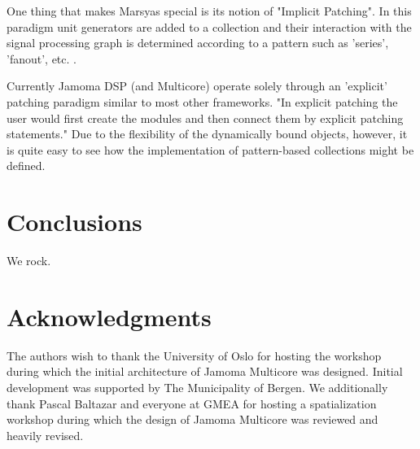\documentclass[twoside,a4paper]{article}
\begin{document}
One thing that makes Marsyas special is its notion of "Implicit Patching".  In this paradigm unit generators are added to a collection and their interaction with the signal processing graph is determined according to a pattern such as 'series', 'fanout', etc. \cite{Bray:2005}.

Currently Jamoma DSP (and Multicore) operate solely through an 'explicit' patching paradigm similar to most other frameworks.  "In explicit patching the user would first create the modules and then connect them by explicit patching statements."  Due to the flexibility of the dynamically bound objects, however, it is quite easy to see how the implementation of pattern-based collections might be defined.



\section{Conclusions}
We rock.

%
%
%
%




\section{Acknowledgments}

The authors wish to thank the University of Oslo for hosting the workshop during which the initial architecture of Jamoma Multicore was designed. Initial development was supported by The Municipality of Bergen.  We additionally thank Pascal Baltazar and everyone at GMEA for hosting a spatialization workshop during which the design of Jamoma Multicore was reviewed and heavily revised.




\end{document}

